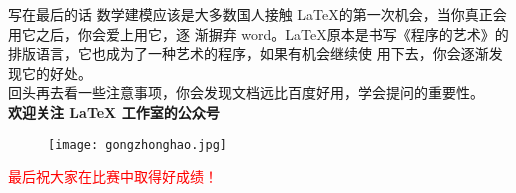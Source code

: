 \begin{frame}{写在最后的话}
\phantom{幻影}数学建模应该是大多数国人接触 \LaTeX 的第一次机会，当你真正会用它之后，你会爱上用它，逐
渐摒弃 word。\LaTeX 原本是书写《程序的艺术》的排版语言，它也成为了一种艺术的程序，如果有机会继续使
用下去，你会逐渐发现它的好处。\\
\phantom{幻影} 回头再去看一些注意事项，你会发现文档远比百度好用，学会提问的重要性。\\
\phantom{幻影幻影幻幻影} \textbf{欢迎关注 LaTeX 工作室的公众号}
\begin{figure}
\centering
\texttt{[image: gongzhonghao.jpg]}
\end{figure}
\phantom{幻影幻影幻影} \textcolor{red}{\Large 最后祝大家在比赛中取得好成绩！}

\end{frame}